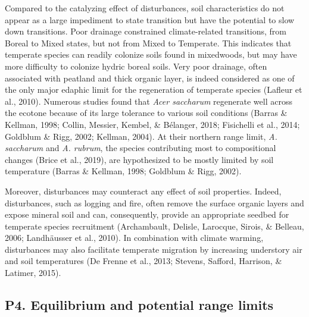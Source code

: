 \documentclass[a4paperpaper,]{article}
\begin{document}
Compared to the catalyzing effect of disturbances, soil characteristics
do not appear as a large impediment to state transition but have the
potential to slow down transitions. Poor drainage constrained
climate-related transitions, from Boreal to Mixed states, but not from
Mixed to Temperate. This indicates that temperate species can readily
colonize soils found in mixedwoods, but may have more difficulty to
colonize hydric boreal soils. Very poor drainage, often associated with
peatland and thick organic layer, is indeed considered as one of the
only major edaphic limit for the regeneration of temperate species
(Lafleur et al., 2010). Numerous studies found that \emph{Acer
saccharum} regenerate well across the ecotone because of its large
tolerance to various soil conditions (Barras \& Kellman, 1998; Collin,
Messier, Kembel, \& Bélanger, 2018; Fisichelli et al., 2014; Goldblum \&
Rigg, 2002; Kellman, 2004). At their northern range limit, \emph{A.
saccharum} and \emph{A. rubrum}, the species contributing most to
compositional changes (Brice et al., 2019), are hypothesized to be
mostly limited by soil temperature (Barras \& Kellman, 1998; Goldblum \&
Rigg, 2002).

Moreover, disturbances may counteract any effect of soil properties.
Indeed, disturbances, such as logging and fire, often remove the surface
organic layers and expose mineral soil and can, consequently, provide an
appropriate seedbed for temperate species recruitment (Archambault,
Delisle, Larocque, Sirois, \& Belleau, 2006; Landhäusser et al., 2010).
In combination with climate warming, disturbances may also facilitate
temperate migration by increasing understory air and soil temperatures
(De Frenne et al., 2013; Stevens, Safford, Harrison, \& Latimer, 2015).

\hypertarget{p4.-equilibrium-and-potential-range-limits}{%
\subsection{P4. Equilibrium and potential range
limits}\label{p4.-equilibrium-and-potential-range-limits}}
\end{document}
